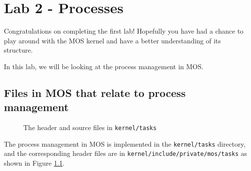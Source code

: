 \chapter{Lab 2 - Processes}

Congratulations on completing the first lab! Hopefully you have had a chance to play
around with the MOS kernel and have a better understanding of its structure.

In this lab, we will be looking at the process management in MOS.

\section{Files in MOS that relate to process management}

\begin{figure}[ht]
    \centering
    \caption{The header and source files in \texttt{kernel/tasks}}
    \label{fig:mos-process-management-files}
\end{figure}

The process management in MOS is implemented in the \texttt{kernel/tasks} directory, and the
corresponding header files are in \texttt{kernel/include/private/mos/tasks} as shown in
Figure \ref{fig:mos-process-management-files}.

